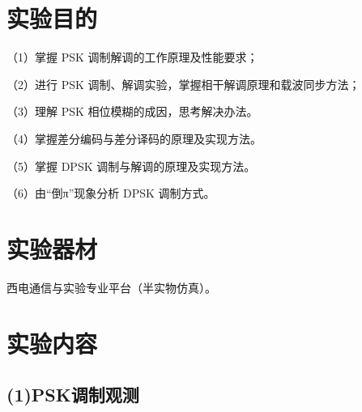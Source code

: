\documentclass{xjtureport}
\begin{document}
\begin{titlepage}
	
\end{titlepage}







\section{实验目的}
（1）掌握 PSK 调制解调的工作原理及性能要求；

（2）进行 PSK 调制、解调实验，掌握相干解调原理和载波同步方法；

（3）理解 PSK 相位模糊的成因，思考解决办法。

（4）掌握差分编码与差分译码的原理及实现方法。

（5）掌握 DPSK 调制与解调的原理及实现方法。

（6）由“倒π”现象分析 DPSK 调制方式。

\section{实验器材}

西电通信与实验专业平台（半实物仿真）。

\section{实验内容}

\subsection*{(1)PSK调制观测}
\end{document}
